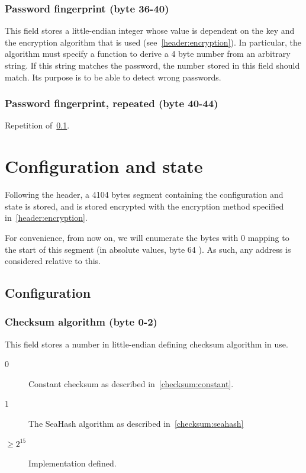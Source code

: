\documentclass[11pt,a4paper]{report}
\newcommand{\clustersize}{4104 }
\newcommand{\diskheadersize}{64 }
\begin{document}
        \subsection{Password fingerprint (byte 36-40)}
        \label{header:fingerprint}
        This field stores a little-endian integer whose value is dependent on
        the key and the encryption algorithm that is used
        (see~\ref{header:encryption}). In particular, the algorithm must
        specify a function to derive a 4 byte number from an arbitrary string.
        If this string matches the password, the number stored in this field
        should match. Its purpose is to be able to detect wrong passwords.

        \subsection{Password fingerprint, repeated (byte 40-44)}
        Repetition of~\ref{header:fingerprint}.

    \chapter{Configuration and state}
    Following the header, a \clustersize bytes segment containing the
    configuration and state is stored, and is stored encrypted with the
    encryption method specified in~\ref{header:encryption}.

    For convenience, from now on, we will enumerate the bytes with $0$ mapping
    to the start of this segment (in absolute values, byte \diskheadersize). As
    such, any address is considered relative to this.

    \section{Configuration}
        \subsection{Checksum algorithm (byte 0-2)}
        \label{config:checksum}
        This field stores a number in little-endian defining checksum algorithm
        in use.

        \begin{description}
            \item [$0$] Constant checksum as described
                in~\ref{checksum:constant}.
            \item [$1$] The SeaHash algorithm as described
                in~\ref{checksum:seahash}
            \item [$\geq 2^{15}$] Implementation defined.
        \end{description}
\end{document}
